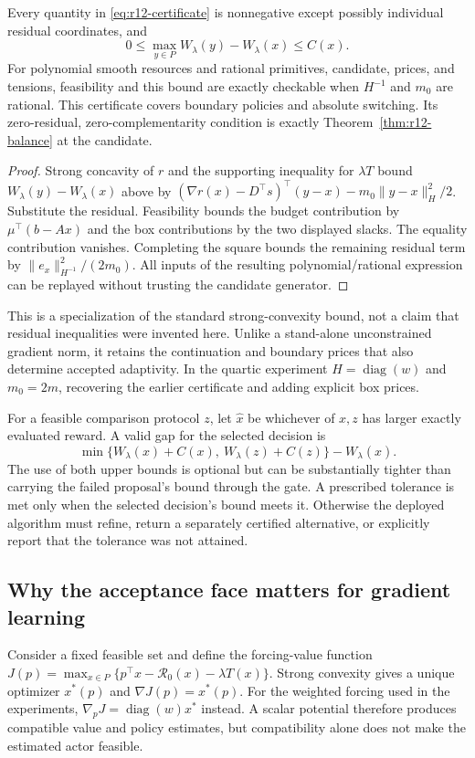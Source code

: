 \begin{theorem}\label{thm:r12-certificate}
Every quantity in \eqref{eq:r12-certificate} is nonnegative except possibly individual residual coordinates, and
\[
 0\leq \max_{y\in P}W_\lambda(y)-W_\lambda(x)\leq C(x).
\]
For polynomial smooth resources and rational primitives, candidate, prices, and tensions, feasibility and this bound are exactly checkable when $H^{-1}$ and $m_0$ are rational. This certificate covers boundary policies and absolute switching. Its zero-residual, zero-complementarity condition is exactly Theorem~\ref{thm:r12-balance} at the candidate.
\end{theorem}
\begin{proof}
Strong concavity of $r$ and the supporting inequality for $\lambda T$ bound $W_\lambda(y)-W_\lambda(x)$ above by
$(\nabla r(x)-D^\top s)^\top(y-x)-m_0\|y-x\|_H^2/2$.
Substitute the residual. Feasibility bounds the budget contribution by $\mu^\top(b-Ax)$ and the box contributions by the two displayed slacks. The equality contribution vanishes. Completing the square bounds the remaining residual term by $\|e_x\|_{H^{-1}}^2/(2m_0)$. All inputs of the resulting polynomial/rational expression can be replayed without trusting the candidate generator.
\end{proof}
This is a specialization of the standard strong-convexity bound, not a claim that residual inequalities were invented here. Unlike a stand-alone unconstrained gradient norm, it retains the continuation and boundary prices that also determine accepted adaptivity. In the quartic experiment $H=\operatorname{diag}(w)$ and $m_0=2m$, recovering the earlier certificate and adding explicit box prices.

For a feasible comparison protocol $z$, let $\widehat x$ be whichever of $x,z$ has larger exactly evaluated reward. A valid gap for the selected decision is
\begin{equation}\label{eq:r12-selected}
 \min\{W_\lambda(x)+C(x),\ W_\lambda(z)+C(z)\}
                  -W_\lambda(\widehat x).
\end{equation}
The use of both upper bounds is optional but can be substantially tighter than carrying the failed proposal's bound through the gate. A prescribed tolerance is met only when the selected decision's bound meets it. Otherwise the deployed algorithm must refine, return a separately certified alternative, or explicitly report that the tolerance was not attained.

\subsection{Why the acceptance face matters for gradient learning}
Consider a fixed feasible set and define the forcing-value function
$J(p)=\max_{x\in P}\{p^\top x-\mathcal R_0(x)-\lambda T(x)\}$.
Strong convexity gives a unique optimizer $x^*(p)$ and $\nabla J(p)=x^*(p)$. For the weighted forcing used in the experiments, $\nabla_pJ=\operatorname{diag}(w)x^*$ instead. A scalar potential therefore produces compatible value and policy estimates, but compatibility alone does not make the estimated actor feasible.

